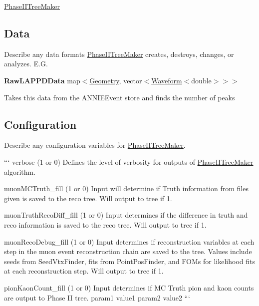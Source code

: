 \hyperlink{classPhaseIITreeMaker}{Phase\-I\-I\-Tree\-Maker}

\subsection*{Data}

Describe any data formats \hyperlink{classPhaseIITreeMaker}{Phase\-I\-I\-Tree\-Maker} creates, destroys, changes, or analyzes. E.\-G.

{\bfseries Raw\-L\-A\-P\-P\-D\-Data} {\ttfamily map$<$\hyperlink{classGeometry}{Geometry}, vector$<$\hyperlink{classWaveform}{Waveform}$<$double$>$$>$$>$}
\begin{DoxyItemize}
\item Takes this data from the {\ttfamily A\-N\-N\-I\-E\-Event} store and finds the number of peaks
\end{DoxyItemize}

\subsection*{Configuration}

Describe any configuration variables for \hyperlink{classPhaseIITreeMaker}{Phase\-I\-I\-Tree\-Maker}.

``` verbose (1 or 0) Defines the level of verbosity for outputs of \hyperlink{classPhaseIITreeMaker}{Phase\-I\-I\-Tree\-Maker} algorithm.

muon\-M\-C\-Truth\-\_\-fill (1 or 0) Input will determine if Truth information from files given is saved to the reco tree. Will output to tree if 1.

muon\-Truth\-Reco\-Diff\-\_\-fill (1 or 0) Input determines if the difference in truth and reco information is saved to the reco tree. Will output to tree if 1.

muon\-Reco\-Debug\-\_\-fill (1 or 0) Input determines if reconstruction variables at each step in the muon event reconstruction chain are saved to the tree. Values include seeds from Seed\-Vtx\-Finder, fits from Point\-Pos\-Finder, and F\-O\-Ms for likelihood fits at each reconstruction step. Will output to tree if 1.

pion\-Kaon\-Count\-\_\-fill (1 or 0) Input determines if M\-C Truth pion and kaon counts are output to Phase I\-I tree. param1 value1 param2 value2 ``` 